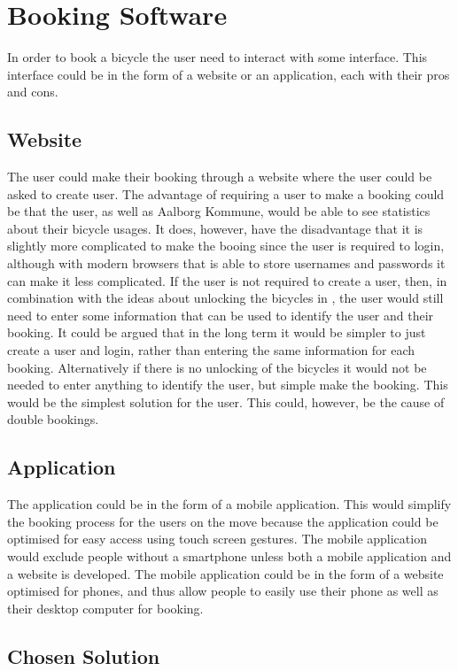 \section{Booking Software}
In order to book a bicycle the user need to interact with some interface.
This interface could be in the form of a website or an application, each with their pros and cons.

\subsection{Website}
The user could make their booking through a website where the user could be asked to create user.
The advantage of requiring a user to make a booking could be that the user, as well as Aalborg Kommune, would be able to see statistics about their bicycle usages.
It does, however, have the disadvantage that it is slightly more complicated to make the booing since the user is required to login, although with modern browsers that is able to store usernames and passwords it can make it less complicated.
If the user is not required to create a user, then, in combination with the ideas about unlocking the bicycles in , the user would still need to enter some information that can be used to identify the user and their booking.
It could be argued that in the long term it would be simpler to just create a user and login, rather than entering the same information for each booking.
Alternatively if there is no unlocking of the bicycles it would not be needed to enter anything to identify the user, but simple make the booking.
This would be the simplest solution for the user.
This could, however, be the cause of double bookings.

\subsection{Application}
The application could be in the form of a mobile application. 
This would simplify the booking process for the users on the move because the application could be optimised for easy access using touch screen gestures.
The mobile application would exclude people without a smartphone unless both a mobile application and a website is developed.
The mobile application could be in the form of a website optimised for phones, and thus allow people to easily use their phone as well as their desktop computer for booking. 

\subsection{Chosen Solution}
